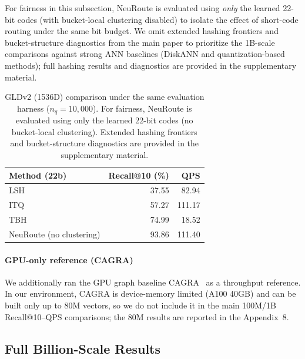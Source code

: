 \documentclass[sigconf, nonacm]{acmart}
\begin{document}
For fairness in this subsection, NeuRoute is evaluated using \emph{only} the learned 22-bit codes
(with bucket-local clustering disabled) to isolate the effect of short-code routing under the same bit budget.
We omit extended hashing frontiers and bucket-structure diagnostics from the main paper to prioritize the 1B-scale
comparisons against strong ANN baselines (DiskANN and quantization-based methods); full hashing results and diagnostics
are provided in the supplementary material.


\begin{table}[t]
\centering
\caption{GLDv2 (1536D) comparison under the same evaluation harness ($n_q{=}10{,}000$).
For fairness, NeuRoute is evaluated using only the learned 22-bit codes (no bucket-local clustering).
Extended hashing frontiers and bucket-structure diagnostics are provided in the supplementary material.}
\footnotesize
\setlength{\tabcolsep}{7pt}
\renewcommand{\arraystretch}{1.05}
\begin{tabular}{lrr}
\toprule
Method (22b) & Recall@10 (\%) & QPS \\
\midrule
LSH & 37.55 & 82.94 \\
ITQ & 57.27 & 111.17 \\
TBH & 74.99 & 18.52 \\
\midrule
NeuRoute (no clustering) & 93.86 & 111.40 \\
\bottomrule
\end{tabular}

\label{tab:gldv2_hash_vs_NeuRoute_main}
\end{table}


\paragraph{GPU-only reference (CAGRA)}
We additionally ran the GPU graph baseline CAGRA~\cite{ootomo2024cagrahighlyparallelgraph} as a throughput reference.
In our environment, CAGRA is device-memory limited (A100 40GB) and can be built only up to 80M vectors, so we do not include it in the main 100M/1B Recall@10--QPS comparisons; the 80M results are reported in the Appendix~8.


\subsection{Full Billion-Scale Results}
\label{subsec:full_1b_results}
\end{document}
